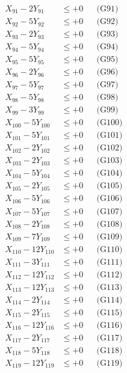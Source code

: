 \documentclass[a4paper,10pt]{article}
\begin{document}
{\begin{align}
X_{91} - 2Y_{91} &\leq +0 && \text{(G91)} \\
X_{92} - 5Y_{92} &\leq +0 && \text{(G92)} \\
X_{93} - 2Y_{93} &\leq +0 && \text{(G93)} \\
X_{94} - 5Y_{94} &\leq +0 && \text{(G94)} \\
X_{95} - 5Y_{95} &\leq +0 && \text{(G95)} \\
X_{96} - 2Y_{96} &\leq +0 && \text{(G96)} \\
X_{97} - 5Y_{97} &\leq +0 && \text{(G97)} \\
X_{98} - 5Y_{98} &\leq +0 && \text{(G98)} \\
X_{99} - 3Y_{99} &\leq +0 && \text{(G99)} \\
\allowbreak
X_{100} - 5Y_{100} &\leq +0 && \text{(G100)} \\
X_{101} - 5Y_{101} &\leq +0 && \text{(G101)} \\
X_{102} - 2Y_{102} &\leq +0 && \text{(G102)} \\
X_{103} - 2Y_{103} &\leq +0 && \text{(G103)} \\
X_{104} - 5Y_{104} &\leq +0 && \text{(G104)} \\
X_{105} - 2Y_{105} &\leq +0 && \text{(G105)} \\
X_{106} - 5Y_{106} &\leq +0 && \text{(G106)} \\
X_{107} - 5Y_{107} &\leq +0 && \text{(G107)} \\
X_{108} - 2Y_{108} &\leq +0 && \text{(G108)} \\
X_{109} - 7Y_{109} &\leq +0 && \text{(G109)} \\
\allowbreak
X_{110} - 12Y_{110} &\leq +0 && \text{(G110)} \\
X_{111} - 3Y_{111} &\leq +0 && \text{(G111)} \\
X_{112} - 12Y_{112} &\leq +0 && \text{(G112)} \\
X_{113} - 12Y_{113} &\leq +0 && \text{(G113)} \\
X_{114} - 2Y_{114} &\leq +0 && \text{(G114)} \\
X_{115} - 2Y_{115} &\leq +0 && \text{(G115)} \\
X_{116} - 12Y_{116} &\leq +0 && \text{(G116)} \\
X_{117} - 2Y_{117} &\leq +0 && \text{(G117)} \\
X_{118} - 5Y_{118} &\leq +0 && \text{(G118)} \\
X_{119} - 12Y_{119} &\leq +0 && \text{(G119)} \\
\end{align}
}
\end{document}
